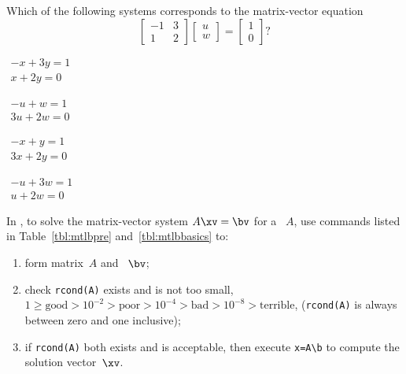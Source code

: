 \begin{activity}
Which of the following systems corresponds to the matrix-vector equation
\begin{equation*}
\begin{bmatrix} -1&3\\1&2 \end{bmatrix}\begin{bmatrix} u\\w \end{bmatrix}=\begin{bmatrix} 1\\0 \end{bmatrix}?
\end{equation*}
\begin{parts}
\item \(\begin{matrix} -x+3y=1\\x+2y=0 \end{matrix}\)
\item \(\begin{matrix} -u+w=1\\3u+2w=0 \end{matrix}\)
\item \(\begin{matrix} -x+y=1\\3x+2y=0 \end{matrix}\)
\item \(\begin{matrix} -u+3w=1\\u+2w=0 \end{matrix}\)
\end{parts}
\end{activity}




\begin{procedure} \label{pro:unisol}
In \script, to solve the matrix-vector system \(A\xv=\bv\) for a ~\(A\), use commands listed in Table~\ref{tbl:mtlbpre} and~\ref{tbl:mtlbbasics} to:
\begin{enumerate}
\item form matrix~\(A\) and ~\(\bv\);
\item check \verb|rcond(A)| exists and is not too small, \(1\geq\text{good} >10^{-2} >\text{poor} >10^{-4} >\text{bad} >10^{-8} >\text{terrible}\), (\verb|rcond(A)| is always between zero and one inclusive);
\item if \verb|rcond(A)| both exists and is acceptable, then execute \verb|x=A\b| to compute the solution vector~\(\xv\). 
\end{enumerate}
\end{procedure}

